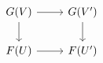 \documentclass[crop,dvisvgm]{standalone}
\begin{document}
\[\begin {tikzcd}
          G(V)
            \ar [r]
            \ar [d]
          & G(V')
            \ar [d]
        \\F(U)
            \ar [r]
          & F(U')
        \end {tikzcd}\]
\end{document}

